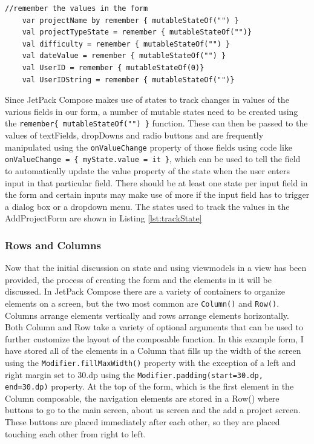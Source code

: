 \documentclass[12pt]{article}
\begin{document}
\begin{lstlisting}[numbers=none, 
			caption=Tracking State Changes,
			label={lst:trackState}]
 //remember the values in the form
    var projectName by remember { mutableStateOf("") }
    val projectTypeState = remember { mutableStateOf("")}
    val difficulty = remember { mutableStateOf("") }
    val dateValue = remember { mutableStateOf("") }
    val UserID = remember { mutableStateOf(0)}
    val UserIDString = remember { mutableStateOf("")}
\end{lstlisting}
Since JetPack Compose makes use of states to track changes in values of the various fields in our form, a number of mutable states need to be created using the \verb|remember{ mutableStateOf("") }| function. These can then be passed to the values of textFields, dropDowns and radio buttons and are frequently manipulated using the \verb|onValueChange| property of those fields using code like \verb|onValueChange = { myState.value = it }|, which can be used to tell the field to automatically update the value property of the state when the user enters input in that particular field. There should be at least one state per input field in the form and certain inputs may make use of more if the input field has to trigger a dialog box or a dropdown menu. The states used to track the values in the AddProjectForm are shown in Listing \ref{lst:trackState}

\subsubsection{Rows and Columns}
Now that the initial discussion on state and using viewmodels in a view has been provided, the process of creating the form and the elements in it will be discussed. In JetPack Compose there are a variety of containers to organize elements on a screen, but the two most common are \verb|Column()| and \verb|Row()|. Columns arrange elements vertically and rows arrange elements horizontally. Both Column and Row take a variety of optional arguments that can be used to further customize the layout of the composable function. In this example form, I have stored all of the elements in a Column that fills up the width of the screen using the \verb|Modifier.fillMaxWidth()| property with the exception of a left and right margin set to 30.dp using the \verb|Modifier.padding(start=30.dp, end=30.dp)| property. 
At the top of the form, which is the first element in the Column composable, the navigation elements are stored in a Row() where buttons to go to the main screen, about us screen and the add a project screen. These buttons are placed immediately after each other, so they are placed touching each other from right to left. 
\end{document}
